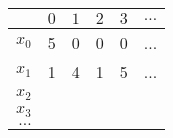 
\begin{longtable}{|r||r|r|r|r|r|}
\hline 
         & $0$ & $1$ & $2$ & $3$ & $\ldots$ \\ \hline \hline 
$x_0$    & 5   & 0   & 0   & 0   & ...      \\ \hline 
$x_1$    & 1   & 4   & 1   & 5   & ...      \\ \hline 
$x_2$    &     &     &     &     &          \\ \hline 
$x_3$    &     &     &     &     &          \\ \hline 
$\ldots$ &     &     &     &     &          \\ \hline 
\end{longtable}
        
